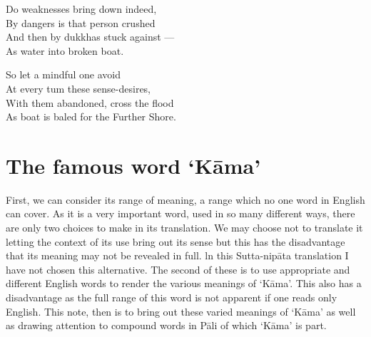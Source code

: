 \begin{MyDescription}{}
Do weaknesses bring down indeed,\\
By dangers is that person crushed\\
And then by dukkhas stuck against —\\
As water into broken boat.
\end{MyDescription}

\begin{MyDescription}{}
So let a mindful one avoid\\
At every tum these sense-desires,\\
With them abandoned, cross the flood\\
As boat is baled for the Further Shore.
\end{MyDescription}

\begin{MyDescription}[(Sn. 766-771)]{}

\end{MyDescription}



\section{The famous word `K\=ama'}

First, we can consider its range of meaning, a range which no one word in English can cover. As it is a very important word, used in so many different ways, there are only two choices to make in its translation. We may choose not to translate it letting the context of its use bring out its sense but this has the disadvantage that its meaning may not be revealed in full. ln this Sutta-nip\=ata translation I have not chosen this alternative. The second of these is to use appropriate and different English words to render the various meanings of `K\=ama'. This also has a disadvantage as the full range of this word is not apparent if one reads only English. This note, then is to bring out these varied meanings of `K\=ama' as well as drawing attention to compound words in P\=ali of which `K\=ama' is part. \\

